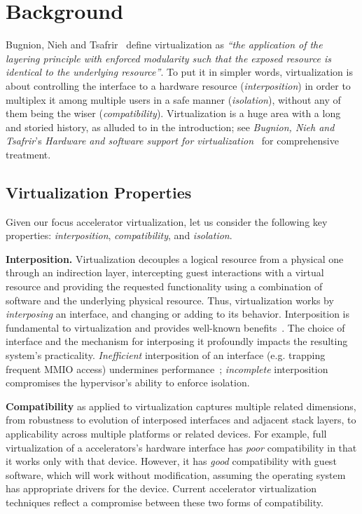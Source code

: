 \chapter{Background}
\label{chapter:background}

Bugnion, Nieh and Tsafrir~\cite{bugnion-nieh-tsafrir} define virtualization as
\textit{``the application of the layering principle with enforced modularity
such that the exposed resource is identical to the underlying resource''}.
To put it in simpler words, virtualization is about controlling the interface
to a hardware resource (\emph{interposition}) in order to multiplex it among
multiple users in a safe manner (\emph{isolation}), without any of them being
the wiser (\emph{compatibility}). Virtualization is a huge area with a long
and storied history, as alluded to in the introduction;
see \textit{Bugnion, Nieh and Tsafrir}'s \textit{Hardware and software support for virtualization}~\cite{bugnion-nieh-tsafrir} for comprehensive treatment.

\section{Virtualization Properties}
\label{s:properties}

Given our focus accelerator virtualization, let us consider the following key
properties: \emph{interposition}, \emph{compatibility}, and \emph{isolation}.

\textbf{Interposition.}
Virtualization decouples a logical resource from a physical one
through an indirection layer, intercepting guest interactions with
a virtual resource and providing the requested functionality using
a combination of software and the underlying physical resource.
Thus, virtualization works by \emph{interposing}
an interface, and changing or adding to its behavior.
Interposition is fundamental to virtualization and provides well-known benefits~\cite{waldspurger12cacm}.
The choice of interface and the mechanism for interposing it
profoundly impacts the resulting system's practicality.
\emph{Inefficient} interposition of an interface (e.g. trapping frequent MMIO access) undermines
performance~\cite{suzuki2014gpuvm,yu2017fullvirt}; \emph{incomplete} interposition
compromises the hypervisor's ability to enforce isolation.

\textbf{Compatibility} as applied to virtualization captures multiple related
dimensions, from robustness to evolution of interposed interfaces and adjacent
stack layers, to applicability across multiple platforms or related devices.
For example, full virtualization of a accelerators's hardware interface
 has \emph{poor} compatibility in that it works only with
that device. However, it has \emph{good} compatibility with guest software,
which will work without modification, assuming the operating system has
appropriate drivers for the device.
Current accelerator virtualization techniques
reflect a compromise between these two forms of compatibility.


